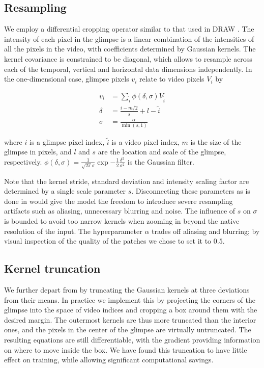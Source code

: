\documentclass{article} %
\begin{document}
\subsection{Resampling}
\label{sec:resampling}

We employ a differential cropping operator similar to that used in DRAW \cite{draw}.
The intensity of each pixel in the glimpse is a linear combination of the intensities of all the pixels in the video, with coefficients determined by Gaussian kernels.
The kernel covariance is constrained to be diagonal, which allows to resample across each of the temporal, vertical and horizontal data dimensions independently.
In the one-dimensional case, glimpse pixels $v_i$ relate to video pixels $V_i$ by

\begin{equation}
\begin{split}
v_i &= \sum_{\tilde{i}} \phi(\delta,\sigma) V_{\tilde{i}} \\
\delta & =  \frac{i - m/2}{s} + l - \tilde{i} \\
\sigma & =  \frac{\alpha}{\min(s, 1)}
\end{split}
\end{equation}

where $i$ is a glimpse pixel index, $\tilde{i}$ is a video pixel index, $m$ is the size of the glimpse in pixels, and $l$ and $s$ are the location and scale of the glimpse, respectively.
$\phi( \delta, \sigma ) = \frac{1}{\sqrt{2 \pi}\sigma} \exp{- \frac{1}{2} \frac{\delta^2}{\sigma^2}}$ is the Gaussian filter.

Note that the kernel stride, standard deviation and intensity scaling factor are determined by a single scale parameter $s$.
Disconnecting these parameters as is done in \cite{draw} would give the model the freedom to introduce severe resampling artifacts such as aliasing, unnecessary blurring and noise.
The influence of $s$ on $\sigma$ is bounded to avoid too narrow kernels when zooming in beyond the native resolution of the input.
The hyperparameter $\alpha$ trades off aliasing and blurring; by visual inspection of the quality of the patches we chose to set it to $0.5$.

\subsection{Kernel truncation}

We further depart from \cite{draw} by truncating the Gaussian kernels at three deviations from their means.
In practice we implement this by projecting the corners of the glimpse into the space of video indices and cropping a box around them with the desired margin.
The outermost kernels are thus more truncated than the interior ones, and the pixels in the center of the glimpse are virtually untruncated.
The resulting equations are still differentiable, with the gradient providing information on where to move inside the box.
We have found this truncation to have little effect on training, while allowing significant computational savings.
\end{document}
